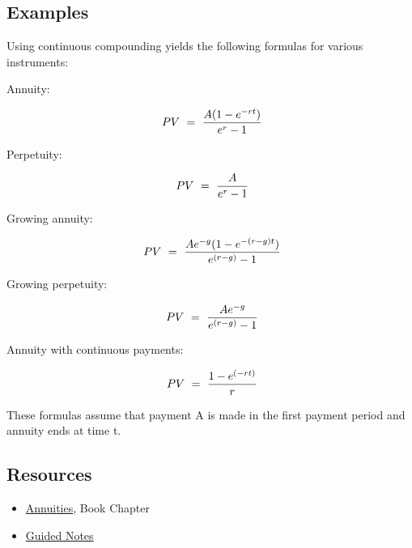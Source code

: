 \subsection{Examples}
\label{sss:exam-bfeb}




Using continuous compounding yields the following formulas for various instruments:



Annuity:

$$\ PV \ = \ {A(1-e^{-rt}) \over e^r -1}$$



Perpetuity:

$$\ PV  \ = \  {A \over e^r - 1}$$



Growing annuity:

$$\ PV  \ = \  {Ae^{-g}(1-e^{-(r-g)t}) \over e^{(r-g)} - 1}$$



Growing perpetuity:

$$\ PV  \ = \  {Ae^{-g} \over e^{(r-g)} - 1}$$



Annuity with continuous payments:

$$\ PV  \ = \  { 1 - e^{(-rt)} \over r }$$



These formulas assume that payment A is made in the first payment period and annuity ends at time t.




\subsection{Resources}
\label{sss:reso-55b5}




\begin{itemize}
    \item \href{https://mathresearch.utsa.edu/wikiFiles/MAT1053/Annuities/MAT1053_M7.2Annuities.pdf}{Annuities}, Book Chapter
    \item \href{https://mathresearch.utsa.edu/wikiFiles/MAT1053/Annuities/MAT1053_M7.2AnnuitiesGN.pdf}{Guided Notes}
\end{itemize}


